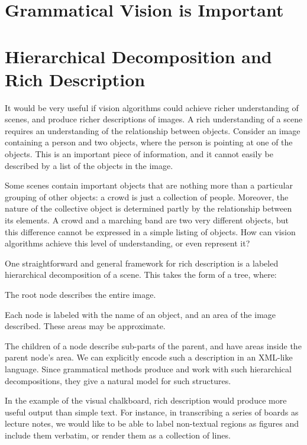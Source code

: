 \section{Grammatical Vision is Important}

\section{Hierarchical Decomposition and Rich Description}
\label{sec-annotation}

It would be very useful if vision algorithms could achieve richer
understanding of scenes, and produce richer descriptions of images. A
rich understanding of a scene requires an understanding of the
relationship between objects. Consider an image containing a person
and two objects, where the person is pointing at one of the
objects. This is an important piece of information, and it cannot
easily be described by a list of the objects in the image.

Some scenes contain important objects that are nothing more than a
particular grouping of other objects: a crowd is just a collection of
people. Moreover, the nature of the collective object is determined
partly by the relationship between its elements. A crowd and a
marching band are two very different objects, but this difference
cannot be expressed in a simple listing of objects. How can vision
algorithms achieve this level of understanding, or even represent it?

One straightforward and general framework for rich description is a
labeled hierarchical decomposition of a
scene. \cite{zhu-mumford} This takes the form of a tree, where:
\bitem
\item The root node describes the entire image.
\item Each node is labeled with the name of an object, and an area of the image described. These areas may be approximate.
\item The children of a node describe sub-parts of the parent, and
  have areas inside the parent node's area.
\eitem
We can explicitly encode such a description in an XML-like language.
Since grammatical methods produce and work with such hierarchical
decompositions, they give a natural model for such structures.

In the example of the visual chalkboard, rich description would
produce more useful output than simple text. For instance, in
transcribing a series of boards as lecture notes, we would like to be
able to label non-textual regions as figures and include them
verbatim, or render them as a collection of lines.


